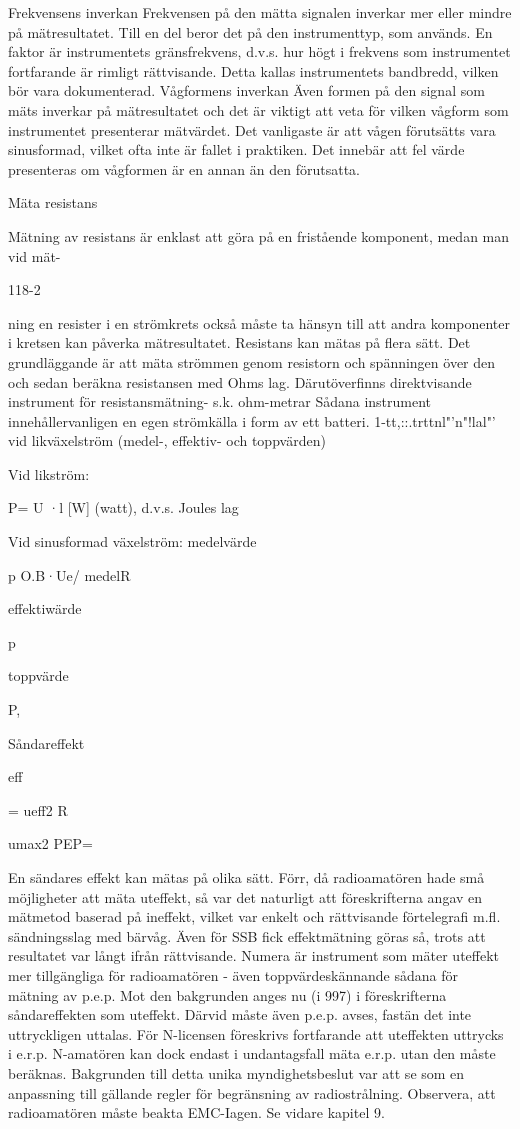 \documentclass[a4paper,twoside,twocolumn,openright]{book}
\begin{document}
{{{{{Frekvensens inverkan
Frekvensen på den mätta signalen inverkar
mer eller mindre på mätresultatet. Till en del
beror det på den instrumenttyp, som används. En faktor är instrumentets gränsfrekvens, d.v.s. hur högt i frekvens som instrumentet fortfarande är rimligt rättvisande. Detta
kallas instrumentets bandbredd, vilken bör
vara dokumenterad.
Vågformens inverkan
Även formen på den signal som mäts inverkar på mätresultatet och det är viktigt att veta
för vilken vågform som instrumentet presenterar mätvärdet. Det vanligaste är att vågen
förutsätts vara sinusformad, vilket ofta inte är
fallet i praktiken. Det innebär att fel värde
presenteras om vågformen är en annan än
den förutsatta.

Mäta resistans

Mätning av resistans är enklast att göra på en
fristående komponent, medan man vid mät-

118-2

ning
en resister i en strömkrets också
måste ta hänsyn till att andra komponenter i
kretsen kan påverka mätresultatet.
Resistans kan mätas på flera sätt. Det
grundläggande är att mäta strömmen genom resistorn och spänningen över den och
sedan beräkna resistansen med Ohms lag.
Därutöverfinns direktvisande instrument
för resistansmätning- s.k. ohm-metrar Sådana instrument innehållervanligen en egen
strömkälla i form av ett batteri.
1-tt,::.trttnl"'n"!lal"' vid likväxelström
(medel-, effektiv- och toppvärden)

Vid likström:

P= U ·l [W] (watt),
d.v.s. Joules lag

Vid sinusformad växelström:
medelvärde

p
 O.B·Ue/
medelR

effektiwärde

p

toppvärde

P,

Såndareffekt

eff

= ueff2
R

umax2
PEP=~

En sändares effekt kan mätas på olika sätt.
Förr, då radioamatören hade små möjligheter att mäta uteffekt, så var det naturligt att
föreskrifterna angav en mätmetod baserad
på ineffekt, vilket var enkelt och rättvisande
förtelegrafi m.fl. sändningsslag med bärvåg.
Även för SSB fick effektmätning göras så,
trots att resultatet var långt ifrån rättvisande.
Numera är instrument som mäter uteffekt
mer tillgängliga för radioamatören - även
toppvärdeskännande sådana för mätning av
p.e.p. Mot den bakgrunden anges nu (i 997)
i föreskrifterna såndareffekten som uteffekt.
Därvid måste även p.e.p. avses, fastän det
inte uttryckligen uttalas.
För N-licensen föreskrivs fortfarande att
uteffekten uttrycks i e.r.p. N-amatören kan
dock endast i undantagsfall mäta e.r.p. utan
den måste beräknas. Bakgrunden till detta
unika myndighetsbeslut var att se som en
anpassning till gällande regler för begränsning av radiostrålning.
Observera, att radioamatören måste beakta EMC-Iagen. Se vidare kapitel 9.

}}}}}
\end{document}
